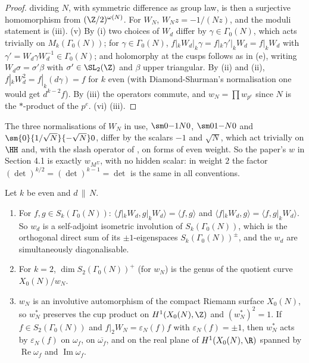 \begin{proof}
dividing $N$, with symmetric difference as group law, is then a surjective homomorphism from $(\Z/2)^{\omega(N)}$. For $W_N$, $W_Nz=-1/(Nz)$, and the moduli statement is
(iii).
(v) By (i) two choices of $W_d$ differ by $\gamma\in\Gamma_0(N)$, which acts trivially on $M_k(\Gamma_0(N))$; for $\gamma\in\Gamma_0(N)$, $f|_kW_d|_k\gamma=f|_k\gamma'|_kW_d=f|_kW_d$ with
$\gamma'=W_d\gamma W_d^{-1}\in\Gamma_0(N)$; and holomorphy at the cusps follows as in (e), writing $W_d\sigma=\sigma'\beta$ with $\sigma'\in\SL_2(\Z)$ and $\beta$ upper triangular.
By (ii) and (ii), $f|_kW_d^2=f|_k(d\gamma)=f$ for $k$ even (with Diamond-Shurman's normalisation one would get $d^{k-2}f$). By (iii) the operators commute, and
$w_N=\prod w_{p^e}$ since $N$ is the $*$-product of the $p^e$.
(vi) (iii).
\end{proof}

The three normalisations of $W_N$ in use, $\sm0{-1}N0$, $\sm01{-N}0$ and $\sm{0}{1/\sqrt N}{-\sqrt N}0$, differ by the scalars $-1$ and $\sqrt N$, which act trivially on $\HH$ and, with the
slash operator of , on forms of even weight. So the paper's $w$ in Section 4.1 is exactly $w_{M^\Sigma}$, with no hidden scalar: in weight $2$ the factor
$(\det)^{k/2}=(\det)^{k-1}=\det$ is the same in all conventions.

\begin{proposition}\label{prop:modforms:atkin-lehner-petersson}
Let $k$ be even and $d\,\|\,N$.
\begin{enumerate}[label=(\roman*)]
\item For $f,g\in S_k(\Gamma_0(N))$: $\langle f|_kW_d,g|_kW_d\rangle=\langle f,g\rangle$ and $\langle f|_kW_d,g\rangle=\langle f,g|_kW_d\rangle$. So $w_d$ is a self-adjoint isometric involution of $S_k(\Gamma_0(N))$, which is the
orthogonal direct sum of its $\pm1$-eigenspaces $S_k(\Gamma_0(N))^\pm$, and the $w_d$ are simultaneously diagonalisable.
\item For $k=2$, $\dim S_2(\Gamma_0(N))^+$ (for $w_N$) is the genus of the quotient curve $X_0(N)/w_N$.
\item $w_N$ is an involutive automorphism of the compact Riemann surface $X_0(N)$, so $w_N^*$ preserves the cup product on $H^1(X_0(N),\Z)$ and $(w_N^*)^2=1$. If
$f\in S_2(\Gamma_0(N))$ and $f|_2W_N=\varepsilon_N(f)f$ with $\varepsilon_N(f)=\pm1$, then $w_N^*$ acts by $\varepsilon_N(f)$ on $\omega_f$, on $\overline{\omega_f}$, and on the real plane of $H^1(X_0(N),\R)$ spanned by
$\operatorname{Re}\omega_f$ and $\operatorname{Im}\omega_f$.
\end{enumerate}
\end{proposition}

